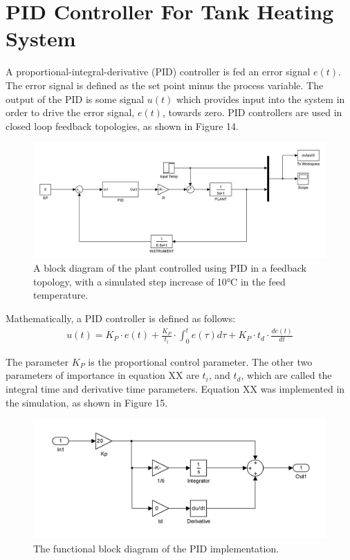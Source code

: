 \documentclass{article}
\begin{document}
\section{PID Controller For Tank Heating System}
A proportional-integral-derivative (PID) controller is fed an error signal $e(t)$. The error signal is defined as the set point minus the process variable. The output of the PID is some signal $u(t)$ which provides input into the system in order to drive the error signal, $e(t)$, towards zero. PID controllers are used in closed loop feedback topologies, as shown in Figure 14.
\begin{figure}[h]
\centering
\includegraphics[scale=0.15]{block_45}
\caption{A block diagram of the plant controlled using PID in a feedback topology, with a simulated step increase of 10$\si{\degreeCelsius}$ in the feed temperature.}
\end{figure}

Mathematically, a PID controller is defined as follows:
\begin{align}
u(t) = K_P \cdot e(t) + \frac{K_P}{t_i} \cdot \int_{0}^{t} e(\tau) d\tau + K_P \cdot t_d \cdot \frac{de(t)}{dt}
\end{align}

The parameter $K_P$ is the proportional control parameter. The other two parameters of importance in equation XX are $t_i$, and $t_d$, which are called the integral time and derivative time parameters. Equation XX was implemented in the simulation, as shown in Figure 15.
\begin{figure}[h]
\centering
\includegraphics[scale=0.15]{block_3_pid}
\caption{The functional block diagram of the PID implementation.}
\end{figure}
\newpage
\end{document}
